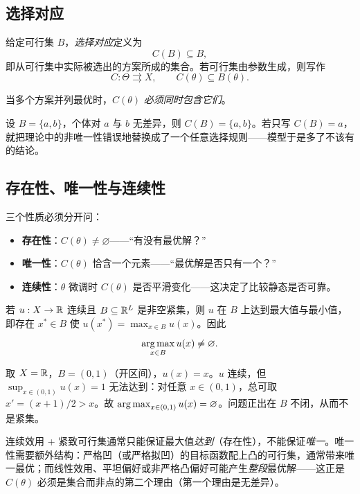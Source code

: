 \subsection{选择对应}

\begin{definition}[选择对应]
给定可行集 $B$，\emph{选择对应}定义为
\[
C(B)\subseteq B,
\]
即从可行集中实际被选出的方案所成的集合。若可行集由参数生成，则写作
\[
C:\Theta\rightrightarrows X,\qquad C(\theta)\subseteq B(\theta).
\]
\end{definition}

当多个方案并列最优时，$C(\theta)$ \emph{必须同时包含它们}。

\begin{example}
设 $B=\{a,b\}$，个体对 $a$ 与 $b$ 无差异，则 $C(B)=\{a,b\}$。若只写 $C(B)=a$，就把理论中的非唯一性错误地替换成了一个任意选择规则——模型于是多了不该有的结论。
\end{example}

\subsection{存在性、唯一性与连续性}

三个性质必须分开问：
\begin{itemize}
  \item \textbf{存在性}：$C(\theta)\neq\varnothing$——“有没有最优解？”
  \item \textbf{唯一性}：$C(\theta)$ 恰含一个元素——“最优解是否只有一个？”
  \item \textbf{连续性}：$\theta$ 微调时 $C(\theta)$ 是否平滑变化——这决定了比较静态是否可靠。
\end{itemize}

\begin{theorem}
若 $u:X\to\mathbb{R}$ 连续且 $B\subseteq\mathbb{R}^{L}$ 是非空紧集，则 $u$ 在 $B$ 上达到最大值与最小值，即存在 $x^{*}\in B$ 使 $u(x^{*})=\max_{x\in B}u(x)$。因此
\[
\operatorname*{arg\,max}_{x\in B}u(x)\neq\varnothing .
\]
\end{theorem}

\begin{example}[开集上最大值可以不存在]
取 $X=\mathbb{R}$，$B=(0,1)$（开区间），$u(x)=x$。$u$ 连续，但 $\sup_{x\in(0,1)}u(x)=1$ 无法达到：对任意 $x\in(0,1)$，总可取 $x'=(x+1)/2>x$。故 $\operatorname*{arg\,max}_{x\in(0,1)}u(x)=\varnothing$。问题正出在 $B$ 不闭，从而不是紧集。
\end{example}

\begin{remark}
连续效用 + 紧致可行集通常只能保证最大值\emph{达到}（存在性），不能保证\emph{唯一}。唯一性需要额外结构：严格凹（或严格拟凹）的目标函数配上凸的可行集，通常带来唯一最优；而线性效用、平坦偏好或非严格凸偏好可能产生\emph{整段}最优解——这正是 $C(\theta)$ 必须是集合而非点的第二个理由（第一个理由是无差异）。
\end{remark}

